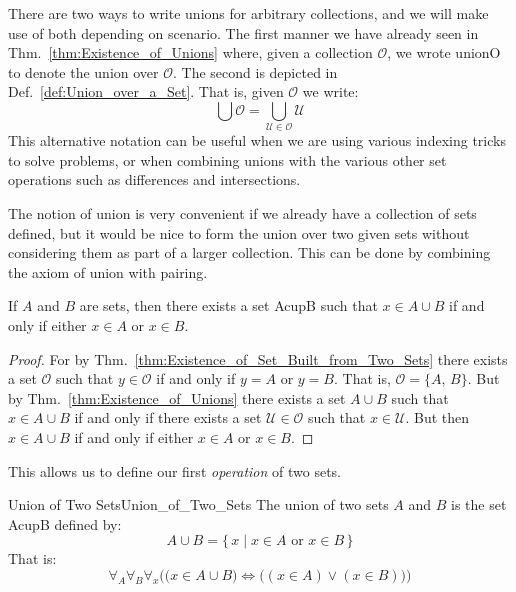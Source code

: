         There are two ways to write unions for arbitrary collections, and we
        will make use of both depending on scenario. The first manner we have
        already seen in Thm.~\ref{thm:Existence_of_Unions} where, given a
        collection $\mathcal{O}$, we wrote \gls{unionO} to denote the union over
        $\mathcal{O}$. The second is depicted in
        Def.~\ref{def:Union_over_a_Set}. That is, given $\mathcal{O}$ we write:
        \begin{equation}
            \bigcup\mathcal{O}=\bigcup_{\mathcal{U}\in\mathcal{O}}\mathcal{U}
        \end{equation}
        This alternative notation can be useful when we are using various
        indexing tricks to solve problems, or when combining unions with the
        various other set operations such as differences and intersections.
        \par\hfill\par
        The notion of union is very convenient if we already have a collection
        of sets defined, but it would be nice to form the union over two given
        sets without considering them as part of a larger collection. This can
        be done by combining the axiom of union with
        pairing.
        \begin{theorem}
            \label{thm:Union_of_Two_Sets_Exists}%
            If $A$ and $B$ are sets, then there exists a set \gls{AcupB} such
            that $x\in{A}\cup{B}$ if and only if either $x\in{A}$ or $x\in{B}$.
        \end{theorem}
        \begin{proof}
            For by Thm.~\ref{thm:Existence_of_Set_Built_from_Two_Sets} there
            exists a set $\mathcal{O}$ such that $y\in\mathcal{O}$ if and only
            if $y=A$ or $y=B$. That is, $\mathcal{O}=\{A,\,B\}$. But by
            Thm.~\ref{thm:Existence_of_Unions} there exists a set $A\cup{B}$
            such that $x\in{A}\cup{B}$ if and only if there exists a set
            $\mathcal{U}\in\mathcal{O}$ such that $x\in\mathcal{U}$. But then
            $x\in{A}\cup{B}$ if and only if either $x\in{A}$ or $x\in{B}$.
        \end{proof}
        This allows us to define our first \textit{operation} of two sets.
        \begin{fdefinition}{Union of Two Sets}{Union_of_Two_Sets}
            The \gls{union of two sets} $A$ and $B$ is the set \gls{AcupB}
            defined by:
            \begin{equation*}
                A\cup{B}=\big\{\,x\;|\;x\in{A}\textrm{ or }x\in{B}\,\big\}
            \end{equation*}
            That is:
            \begin{equation*}
                \forall_{A}\forall_{B}\forall_{x}\Big(
                    \big(x\in{A}\cup{B}\big)
                    \Longleftrightarrow
                    \big((x\in{A})\lor(x\in{B})\big)
                \Big)
            \end{equation*}
        \end{fdefinition}
